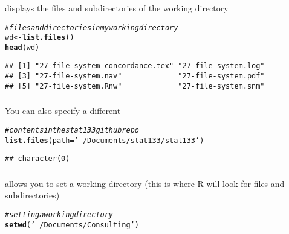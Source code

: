 \documentclass[12pt]{beamer}\usepackage[]{graphicx}\usepackage[]{color}
\makeatletter
\newcommand{\hlstr}[1]{\textcolor[rgb]{0.192,0.494,0.8}{#1}}%
\newcommand{\hlcom}[1]{\textcolor[rgb]{0.678,0.584,0.686}{\textit{#1}}}%
\newcommand{\hlstd}[1]{\textcolor[rgb]{0.345,0.345,0.345}{#1}}%
\newcommand{\hlkwb}[1]{\textcolor[rgb]{0.69,0.353,0.396}{#1}}%
\newcommand{\hlkwc}[1]{\textcolor[rgb]{0.333,0.667,0.333}{#1}}%
\newcommand{\hlkwd}[1]{\textcolor[rgb]{0.737,0.353,0.396}{\textbf{#1}}}%
\newenvironment{kframe}{%
 \def\at@end@of@kframe{}%
 \ifinner\ifhmode%
  \def\at@end@of@kframe{\end{minipage}}%
  \begin{minipage}{\columnwidth}%
 \fi\fi%
 \def\FrameCommand##1{\hskip\@totalleftmargin \hskip-\fboxsep
 \colorbox{shadecolor}{##1}\hskip-\fboxsep
     \hskip-\linewidth \hskip-\@totalleftmargin \hskip\columnwidth}%
 \MakeFramed {\advance\hsize-\width
   \@totalleftmargin\z@ \linewidth\hsize
   \@setminipage}}%
 {\par\unskip\endMakeFramed%
 \at@end@of@kframe}
\newenvironment{knitrout}{}{} %
\makeatother
\begin{document}

\begin{frame}[fragile]
\frametitle{}

{\hilit {}} displays the files and subdirectories of the working directory
\begin{knitrout}\scriptsize
{}\color{fgcolor}\begin{kframe}
\begin{alltt}
\hlcom{# files and directories in my working directory}
\hlstd{wd} \hlkwb{<-} \hlkwd{list.files}\hlstd{()}
\hlkwd{head}\hlstd{(wd)}
\end{alltt}
\begin{verbatim}
## [1] "27-file-system-concordance.tex" "27-file-system.log"            
## [3] "27-file-system.nav"             "27-file-system.pdf"            
## [5] "27-file-system.Rnw"             "27-file-system.snm"
\end{verbatim}
\end{kframe}
\end{knitrout}

\end{frame}


\begin{frame}[fragile]
\frametitle{}

You can also specify a different 
\begin{knitrout}\footnotesize
{}\color{fgcolor}\begin{kframe}
\begin{alltt}
\hlcom{# contents in the stat133 github repo}
\hlkwd{list.files}\hlstd{(}\hlkwc{path} \hlstd{=} \hlstr{'~/Documents/stat133/stat133'}\hlstd{)}
\end{alltt}
\begin{verbatim}
## character(0)
\end{verbatim}
\end{kframe}
\end{knitrout}

\end{frame}


\begin{frame}[fragile]
\frametitle{}

{\hilit {}} allows you to set a working directory (this is where R will look for files and subdirectories)
\begin{knitrout}\footnotesize
{}\color{fgcolor}\begin{kframe}
\begin{alltt}
\hlcom{# setting a working directory}
\hlkwd{setwd}\hlstd{(}\hlstr{'~/Documents/Consulting'}\hlstd{)}
\end{alltt}
\end{kframe}
\end{knitrout}

\end{frame}
\end{document}
